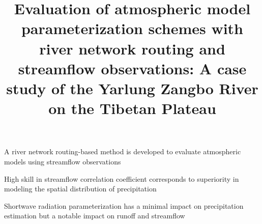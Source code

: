 \documentclass[draft]{agujournal2019}
\begin{document}
\title{Evaluation of atmospheric model parameterization schemes with river network routing and streamflow observations: A case study of the Yarlung Zangbo River on the Tibetan Plateau}




\begin{keypoints}
\item A river network routing-based method is developed to evaluate atmospheric models using streamflow observations
\item High skill in streamflow correlation coefficient corresponds to superiority in modeling the spatial distribution of precipitation
\item Shortwave radiation parameterization has a minimal impact on precipitation estimation but a notable impact on runoff and streamflow
\end{keypoints}
\end{document}
